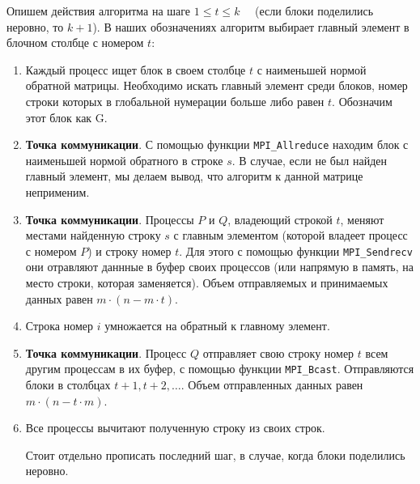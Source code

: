 \documentclass[12pt]{article} %
\begin{document}
Опишем действия алгоритма на шаге $1 \leqslant t \leqslant k\quad$ (если блоки поделились неровно, то $k+1$). В наших обозначениях алгоритм выбирает главный элемент в блочном столбце с номером $t$:
\begin{enumerate}
    \item
    Каждый процесс ищет блок в своем столбце $t$ с наименьшей нормой обратной матрицы. Необходимо искать главный элемент среди блоков, номер строки которых в глобальной нумерации больше либо равен $t$. Обозначим этот блок как G.
    \item
    \textbf{Точка коммуникации}. С помощью функции \texttt{MPI\_Allreduce} находим блок с наименьшей нормой обратного в строке $s$. В случае, если не был найден главный элемент, мы делаем вывод, что алгоритм к данной матрице неприменим.
    \item
    \textbf{Точка коммуникации}. Процессы $P$ и $Q$, владеющий строкой $t$, меняют местами найденную строку $s$ с главным элементом (которой владеет процесс с номером $P$) и строку номер $t$. Для этого с помощью функции \texttt{MPI\_Sendrecv} они отравляют даннные в буфер своих процессов (или напрямую в память, на место строки, которая заменяется). Объем отправляемых и принимаемых данных равен $m \cdot (n - m \cdot t)$.
    \item
    Строка номер $i$ умножается на обратный к главному элемент.
    \item
    \textbf{Точка коммуникации}. Процесс $Q$ отправляет свою строку номер $t$ всем другим процессам в их буфер, с помощью функции \texttt{MPI\_Bcast}. Отправляются блоки в столбцах $t+1, t+2, \ldots$. Объем отправленных данных равен $m \cdot (n - t \cdot m)$.
    \item
    Все процессы вычитают полученную строку из своих строк.

    Стоит отдельно прописать последний шаг, в случае, когда блоки поделились неровно.
\end{enumerate}
\end{document}
